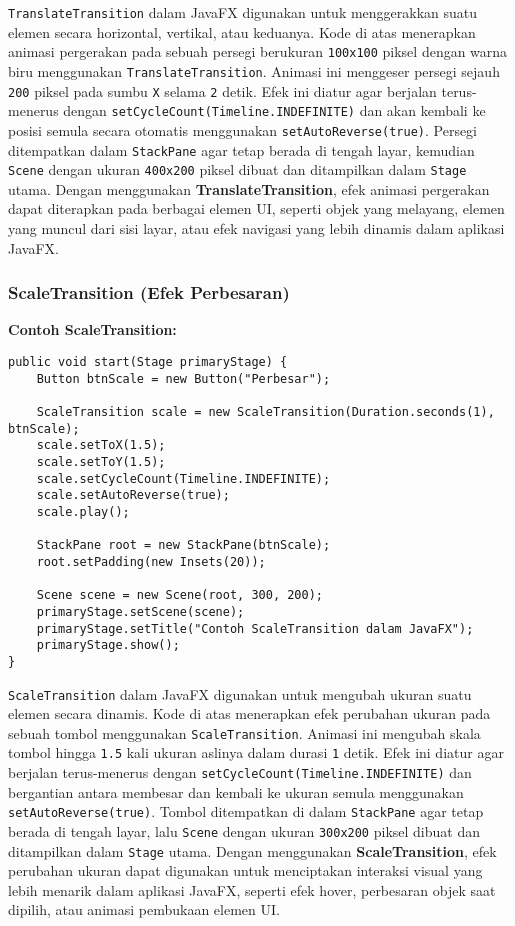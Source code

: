 \texttt{TranslateTransition} dalam JavaFX digunakan untuk menggerakkan suatu elemen secara horizontal, vertikal, atau keduanya. Kode di atas menerapkan animasi pergerakan pada sebuah persegi berukuran \texttt{100x100} piksel dengan warna biru menggunakan \texttt{TranslateTransition}. Animasi ini menggeser persegi sejauh \texttt{200} piksel pada sumbu \texttt{X} selama \texttt{2} detik. Efek ini diatur agar berjalan terus-menerus dengan \texttt{setCycleCount(Timeline.INDEFINITE)} dan akan kembali ke posisi semula secara otomatis menggunakan \texttt{setAutoReverse(true)}. Persegi ditempatkan dalam \texttt{StackPane} agar tetap berada di tengah layar, kemudian \texttt{Scene} dengan ukuran \texttt{400x200} piksel dibuat dan ditampilkan dalam \texttt{Stage} utama. Dengan menggunakan \textbf{TranslateTransition}, efek animasi pergerakan dapat diterapkan pada berbagai elemen UI, seperti objek yang melayang, elemen yang muncul dari sisi layar, atau efek navigasi yang lebih dinamis dalam aplikasi JavaFX.


\subsubsection{ScaleTransition (Efek Perbesaran)}

\textbf{Contoh ScaleTransition:}
\begin{lstlisting}[style=JavaStyle, caption=Mengubah ukuran elemen dalam JavaFX]
public void start(Stage primaryStage) {
	Button btnScale = new Button("Perbesar");
	
	ScaleTransition scale = new ScaleTransition(Duration.seconds(1), btnScale);
	scale.setToX(1.5);
	scale.setToY(1.5);
	scale.setCycleCount(Timeline.INDEFINITE);
	scale.setAutoReverse(true);
	scale.play();
	
	StackPane root = new StackPane(btnScale);
	root.setPadding(new Insets(20));
	
	Scene scene = new Scene(root, 300, 200);
	primaryStage.setScene(scene);
	primaryStage.setTitle("Contoh ScaleTransition dalam JavaFX");
	primaryStage.show();
}
\end{lstlisting}

\texttt{ScaleTransition} dalam JavaFX digunakan untuk mengubah ukuran suatu elemen secara dinamis. Kode di atas menerapkan efek perubahan ukuran pada sebuah tombol menggunakan \texttt{ScaleTransition}. Animasi ini mengubah skala tombol hingga \texttt{1.5} kali ukuran aslinya dalam durasi \texttt{1} detik. Efek ini diatur agar berjalan terus-menerus dengan \texttt{setCycleCount(Timeline.INDEFINITE)} dan bergantian antara membesar dan kembali ke ukuran semula menggunakan \texttt{setAutoReverse(true)}. Tombol ditempatkan di dalam \texttt{StackPane} agar tetap berada di tengah layar, lalu \texttt{Scene} dengan ukuran \texttt{300x200} piksel dibuat dan ditampilkan dalam \texttt{Stage} utama. Dengan menggunakan \textbf{ScaleTransition}, efek perubahan ukuran dapat digunakan untuk menciptakan interaksi visual yang lebih menarik dalam aplikasi JavaFX, seperti efek hover, perbesaran objek saat dipilih, atau animasi pembukaan elemen UI.


